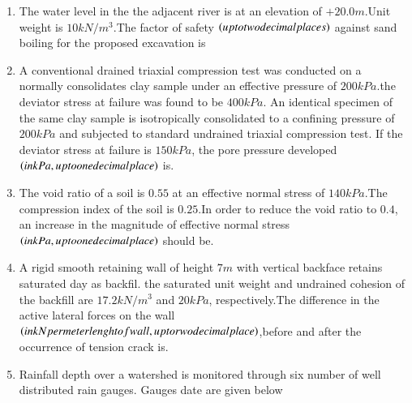 \documentclass[journal]{IEEEtran}
\begin{document}
\begin{enumerate}
 \item The water level in the the adjacent river is at an elevation of $+20.0 m$.Unit weight is $10 kN/m^{3}$.The factor of safety $\left(up to two decimal places\right)$ against sand boiling for the proposed excavation is \\
\item A conventional drained triaxial compression test was conducted  on a normally consolidates clay sample under an effective pressure of $200 kPa$.the deviator stress at failure was found to be $400 kPa$. An identical specimen of the same clay sample is isotropically consolidated to a confining pressure of $200 kPa$ and subjected to standard undrained triaxial compression test. If the deviator stress at failure is $150 kPa$, the pore pressure developed $\left(in kPa, up to one decimal place\right) $ is.\\
\item The void ratio of a soil is $0.55$ at an effective normal stress of $140 kPa$.The compression index of the soil is $0.25$.In order to reduce the void ratio to $0.4$, an increase in the magnitude of effective normal stress $\left(in kPa,up to one decimal place\right)$ should be.\\
\item A rigid smooth retaining wall of height $7 m$ with vertical backface retains saturated day as backfil. the saturated unit weight and undrained cohesion of the backfill are $17.2 kN/m^{3}$ and $20 kPa$, respectively.The difference in the active lateral forces on the wall $\left(in kN per meter lenght of wall,up to rwo decimal place\right)$,before and after the occurrence of tension crack is.\\
\item Rainfall depth over a watershed is monitored through six number of well distributed rain gauges. Gauges date are given below\\


\end{enumerate}
\end{document}
